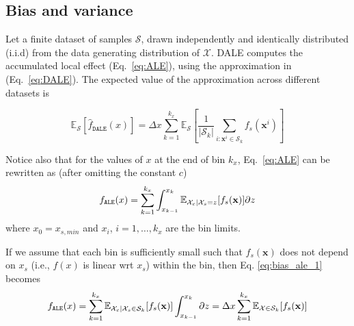 \documentclass[wcp]{jmlr}
\newcommand{\dale}{\hat{f}_{\mathtt{DALE}}}
\newcommand{\xb}{\mathbf{x}} \newcommand{\R}{\mathbb{R}}
\begin{document}
\subsection{Bias and variance}
\label{sec:4-4-std}
Let a finite dataset of samples \(\mathcal{S}\), drawn independently
and identically distributed (i.i.d) from the data generating
distribution of \(\mathcal{X}\). DALE computes the accumulated local
effect (Eq.~\eqref{eq:ALE}), using the approximation in
(Eq.~\eqref{eq:DALE}). The expected value of the approximation across
different datasets is

\begin{equation}
  \mathbb{E}_{\mathcal{S}}[\dale(x)] =
  \Delta x\sum_{k=1}^{k_x}\mathbb{E}_{\mathcal{S}}[\frac{1}{|\mathcal{S}_k|}\sum_{i:\xb^i \in
      \mathcal{S}_k} f_s(\xb^i)]
  \label{eq:bias_dale}
\end{equation}

\noindent
Notice also that for the values of \(x\) at the end of bin \(k_x\),
Eq.~\eqref{eq:ALE} can be rewritten as (after omitting the constant
\(c\))
\begin{equation}
  f_{\mathtt{ALE}}(x) = \sum_{k = 1}^{k_x}\int_{x_{k-1}}^{x_k}
    \mathbb{E}_{\Xcb|\mathcal{X}_s=z}[f_s(\xb)] \partial z
    \label{eq:bias_ale_1}
\end{equation}
where \(x_0=x_{s, min}\) and \(x_i\), \(i=1, \dotsc, k_x\) are the bin limits.

\noindent
If we assume that each bin is sufficiently small such that \(f_s(\xb)\) does
not depend on \(x_s\) (i.e., \(f(x)\) is linear wrt \(x_s\)) within the bin, then
Eq. \eqref{eq:bias_ale_1} becomes
\begin{equation}
  f_{\mathtt{ALE}}(x) = \sum_{k = 1}^{k_x}\mathbb{E}_{\Xcb|\mathcal{X}_s \in
    \mathcal{S}_k}[f_s(\xb)]\int_{x_{k-1}}^{x_k} \partial z
  = \Delta x\sum_{k=1}^{k_x}\mathbb{E}_{\mathcal{X} \in \mathcal{S}_k}[f_s(\xb)]
    \label{eq:bias_ale_2}
\end{equation}
\end{document}
